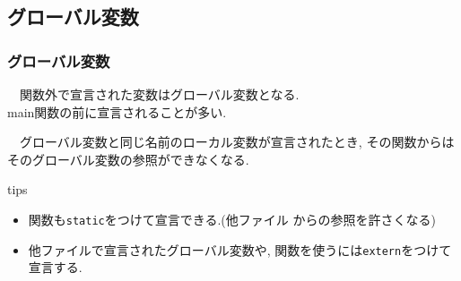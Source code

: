 \documentclass[dvipdfmx]{beamer}
\begin{document}
\subsection{グローバル変数}
\begin{frame}[label=54]
    \frametitle{グローバル変数}
    　関数外で宣言された変数はグローバル変数となる.\\
    main関数の前に宣言されることが多い.
    \vspace{-15pt}
    \begin{table}
    \centering
    \end{table}
    　グローバル変数と同じ名前のローカル変数が宣言されたとき,
        その関数からはそのグローバル変数の参照ができなくなる.
    \begin{itembox}[l]{tips}
        \begin{itemize}
            \item 関数も\texttt{static}をつけて宣言できる.(他ファイル
                からの参照を許さくなる)
            \item 他ファイルで宣言されたグローバル変数や,
                関数を使うには\texttt{extern}をつけて宣言する.
        \end{itemize}
    \end{itembox}
    \vfill \hfill 
    \hyperlink{53}{}
    \space
    \hyperlink{55}{}
\end{frame}
\end{document}
